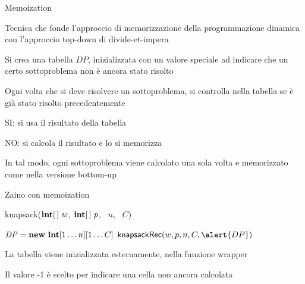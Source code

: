 \begin{frame}{Memoization}

\vspace{-9pt}
\begin{myboxtitle}
Tecnica che fonde l'approccio di memorizzazione della programmazione dinamica con l'approccio top-down di divide-et-impera
\end{myboxtitle}

\BIL
\item Si crea una tabella $\mathit{DP}$, inizializzata con un \alert{valore speciale} ad 
indicare che un certo sottoproblema non è ancora stato risolto
\item Ogni volta che si deve risolvere un sottoproblema, si controlla nella tabella se è già stato risolto precedentemente
\BI
\item SI:  si usa il risultato della tabella
\item NO:  si calcola il risultato e lo si memorizza
\EI
\item In tal modo, ogni sottoproblema viene calcolato una sola volta e memorizzato come nella versione bottom-up
\EIL

\end{frame}

\begin{frame}{Zaino con memoization}

\vspace{-9pt}
\begin{Procedure}
\caption[A]{\textsf{knapsack}($\INTEGER[\,]\ w$, $\INTEGER[\,]\ p$, \INTEGER\ $n$, \INTEGER\ $C$)}
\alert{$\mathit{DP} = \NEW\ \INTEGER[1 \ldots n][1 \ldots C]$\;
}
\Return $\textsf{knapsackRec}(w, p, n, C, \alert{DP})$
\end{Procedure}

\BIL
\item La tabella viene inizializzata esternamente, nella funzione wrapper
\item Il valore -1 è scelto per indicare una cella non ancora calcolata
\EIL

\end{frame}

